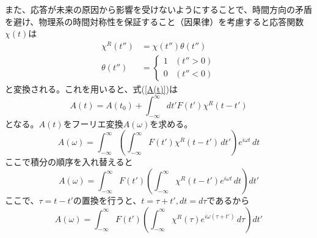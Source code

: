 \documentclass[11pt,a4j]{jreport}
\begin{document}
また、応答が未来の原因から影響を受けないようにすることで、時間方向の矛盾を避け、物理系の時間対称性を保証すること（因果律）を考慮すると応答関数$\chi(t)$は
\begin{align}
  \chi^R(t'') &= \chi(t'')\theta(t'') \label{chi_R} \\
  \theta(t'') &= \begin{cases} 
     1 & (t'' > 0)  \\
     0 & (t'' < 0)
   \end{cases} \label{theta_w}
 \end{align}
と変換される。これを用いると、式(\ref{A(t)})は
\begin{equation}
  A(t)=A(t_0)+\int_{-\infty}^{\infty}{dt'F(t') \chi^R(t-t')}
\end{equation}
となる。$A(t)$をフーリエ変換$A(\omega)$を求める。
\begin{equation}
  A(\omega)=\int_{-\infty}^{\infty} \left( \int_{-\infty}^{\infty} F(t') \chi^R(t - t') \, dt' \right) e^{i \omega t} \, dt
\end{equation}
ここで積分の順序を入れ替えると
\begin{equation}
  A(\omega) = \int_{-\infty}^{\infty} F(t') \left( \int_{-\infty}^{\infty} \chi^R(t - t') e^{i \omega t} \, dt \right) dt'
\end{equation}
ここで、$\tau=t-t'$の置換を行うと、$t=\tau+t',dt=d\tau$であるから
\begin{equation}
  A(\omega) = \int_{-\infty}^{\infty} F(t') \left( \int_{-\infty}^{\infty} \chi^R(\tau) e^{i \omega (\tau + t')} \, d\tau \right) dt'
\end{equation}
\end{document}
